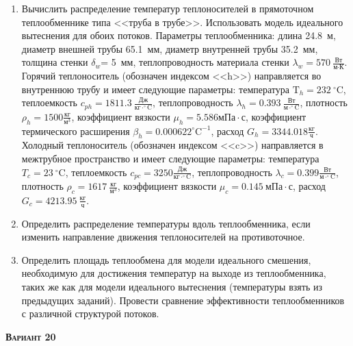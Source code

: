 \begin{enumerate} 
\item Вычислить распределение температур теплоносителей в прямоточном теплообменнике типа <<труба в трубе>>. Использовать модель идеального вытеснения для обоих потоков. Параметры теплообменника: длина  24.8~м, диаметр внешней трубы 65.1~мм,  диаметр внутренней трубы 35.2~мм, толщина стенки $\delta_{w}$=     5~мм,  теплопроводность материала стенки $\lambda_{w}=  570~\frac{\text{Вт}}{\text{м} \cdot \text{К}}$.  Горячий теплоноситель (обозначен индексом <<h>>) направляется во внутреннюю трубу и	 имеет следующие параметры: температура $\text{T}_{h}= 232~^\circ\mathrm{C}$, теплоемкость	  $c_{p{h}}= 1811.3~\frac{\text{Дж}}{\text{кг} \cdot ^\circ\mathrm{C}}$, теплопроводность 		$\lambda_{h}= 0.393~\frac{\text{Вт}}{\text{м} \cdot ^\circ\mathrm{C}}$, плотность 		$\rho_{h}= 1500 \frac{\text{кг}}{\text{м}^3}$, коэффициент вязкости $\mu_{h}=5.586 \text{мПа} 		\cdot \text{с} $, коэффициент термического расширения $\beta_{h}=0.000622 ^\circ\mathrm{C}^{-1}$,		 расход $G_{h}= 3344.018 \frac{\text{кг}}{\text{ч}}$. Холодный теплоноситель (обозначен индексом <<c>>) 		 направляется в межтрубное пространство и имеет следующие параметры: температура $T_{c}=   23		 ~^\circ\mathrm{C}$, теплоемкость $c_{p{c}}= 3250 \frac{\text{Дж}}{\text{кг} \cdot ^\circ\mathrm{C}}$,			 теплопроводность $\lambda_{c}=0.399 \frac{\text{Вт}}{\text{м} \cdot ^\circ\mathrm{C}}$, плотность 			 $\rho_{c}=  1617~\frac{\text{кг}}{\text{м}^3}$, коэффициент вязкости $\mu_{c}=0.145~\text{мПа} \cdot \text{с} $, 			 расход $G_{c}=4213.95~\frac{\text{кг}}{\text{ч}}$. 

\item Определить распределение температуры вдоль теплообменника, если 	изменить направление движения теплоносителей на противоточное.

\item Определить площадь теплообмена для модели идеального смешения, необходимую для достижения 	температур на выходе из теплообменника, таких же как для модели идеального вытеснения (температуры взять из предыдущих заданий).	Провести сравнение эффективности теплообменников с различной структурой потоков.

\end{enumerate}

\textsc{\textbf{Вариант 20}}

